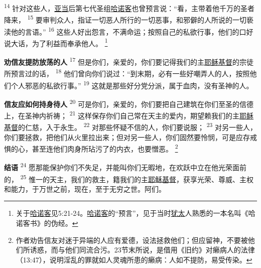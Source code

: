 \begin{multicols}{2}
\textsuperscript{14}
针对这些人，\uline{亚当}后第七代圣组\uline{哈诺客}也曾预言说：“看，主带着他千万的圣者降来，
\textsuperscript{15}
要审判众人，指证一切恶人所行的一切恶事，和邪僻的人所说的一切亵渎他的言语。”
\textsuperscript{16}
这些人好出怨言，不满命运；按照自己的私欲行事，他们的口好说大话，为了利益而奉承他人。
\footnote{关于\uline{哈诺客}见5:21-24。\uline{哈诺客}的“预言”，见于当时\uline{犹太}人熟悉的一本名叫《哈诺客书》的伪经。}

\textbf{劝信友提防放荡的人\quad}
\textsuperscript{17}
但是你们，亲爱的，你们要记得我们的主\uline{耶稣}\uline{基督}的宗徒所预言过的话，
\textsuperscript{18}
他们曾向你们说过：“到末期，必有一些好嘲弄人的人，按照他们个人邪恶的私欲行事。”
\textsuperscript{19}
这就是那些好分党分派，属于血肉，没有圣神的人。

\textbf{信友应如何持身待人\quad}
\textsuperscript{20}
可是你们，亲爱的，你们要把自己建筑在你们至圣的信德上，在圣神内祈祷；
\textsuperscript{21}
这样保存你们自己常在天主的爱内，期望赖我们的主\uline{耶稣}\uline{基督}的仁慈，入于永生。
\textsuperscript{22}
对那些怀疑不信的人，你们要说服；
\textsuperscript{23}
对另一些人，你们要拯救，把他们从火里拉出来；但对另一些人，你们固然要怜悯，可是应存戒惧的心，甚至连他们肉身所玷污了的内衣，也要憎恶。
\footnote{作者劝告信友对迷于异端的人应有爱德，设法拯救他们；但应留神，不要被他们所诱惑，而与他们同流合污。23节末所说，是借用《旧约》对癞病人的法律（13:47），说明淫乱的罪就如人灵魂所患的癞病：人如不提防，易受传染。}

\textbf{结语\quad}
\textsuperscript{24}
愿那能保护你们不失足，并能叫你们无暇地，在欢跃中立在他光荣面前的，
\textsuperscript{25}
惟一的天主，我们的救主，籍我们的主\uline{耶稣}\uline{基督}，获享光荣、尊威、主权和能力，于万世之前，现在，至于无穷之世。阿们。

\end{multicols}